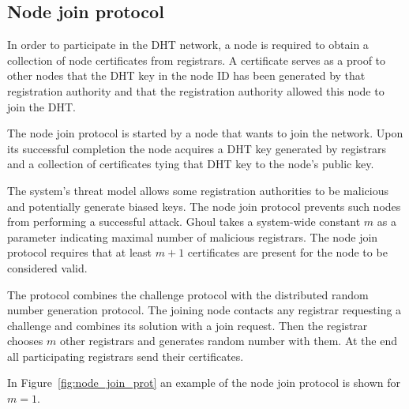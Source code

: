 \subsection{Node join protocol}

In order to participate in the DHT network, a node is required to obtain a
collection of node certificates from registrars. A certificate serves as a proof
to other nodes that the DHT key in the node ID has been generated by that
registration authority and that the registration authority allowed this node to
join the DHT.

The node join protocol is started by a node that wants to join the network.
Upon its successful completion the node acquires a DHT key generated by
registrars and a collection of certificates tying that DHT key to the node's
public key.

The system's threat model allows some registration authorities to be malicious
and potentially generate biased keys. The node join protocol prevents such nodes
from performing a successful attack. Ghoul takes a system-wide constant $m$ as a
parameter indicating maximal number of malicious registrars. The node join
protocol requires that at least $m+1$ certificates are present for the node to
be considered valid.

The protocol combines the challenge protocol with the distributed random number
generation protocol.
The joining node contacts any registrar requesting a challenge and combines its
solution with a join request.
Then the registrar chooses $m$ other registrars and generates random number with
them.
At the end all participating registrars send their certificates.

In Figure~\ref{fig:node_join_prot} an example of the node join protocol is shown
for $m=1$.

